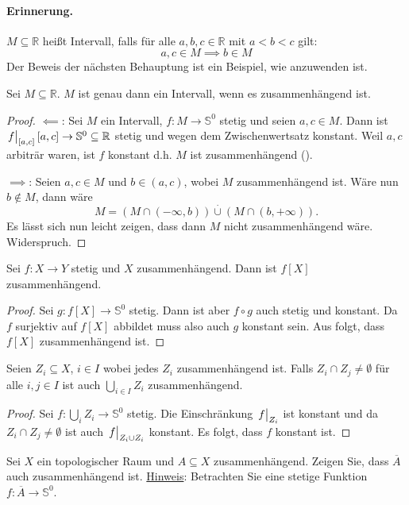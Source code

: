\documentclass[
12pt, 
openany, 
a4paper, 
final,
fleqn, 
]{myclass}
\numberwithin{equation}{chapter}
\numberwithin{section}{chapter}
\newcommand{\RR}{\mathbb R}
\newcommand{\Ss}{\mathbb S}
\newcommand{\union}{\bigcup}
\newcommand{\implication}[2]{\glqq {#1}$\implies${#2}\grqq}
\newcommand{\reverseimplication}[2]{\glqq {#1}$\impliedby${#2}\grqq}
\newcommand{\closure}[1]{\overline{#1}}
\newcommand{\eval}[1]{\left. \vphantom{\int}#1\right\lvert}
\newcommand{\hint}[1]{\newline\noindent\underline{Hinweis}: #1}
\begin{document}
\paragraph{Erinnerung.} $M\subseteq \RR$ heißt Intervall, falls für alle $a, b, c\in \RR$ mit $a<b<c$ gilt: 
\[
a, c \in M \implies b\in M
\]
Der Beweis der nächsten Behauptung ist ein Beispiel, wie  anzuwenden ist. 
\begin{prop}\label{3.4}
Sei $M\subseteq \RR$. $M$ ist genau dann ein Intervall, wenn es zusammenhängend ist. 
\end{prop}
\begin{proof}
\reverseimplication{}{}: Sei $M$ ein Intervall, $f:M \to \Ss^0$ stetig und seien $a, c\in M$. Dann ist $\eval{f}_{[a, c]} [a, c]\to \Ss^0\subseteq \RR$ stetig und wegen dem Zwischenwertsatz konstant. Weil $a, c$ arbiträr waren, ist $f$ konstant d.h. $M$ ist zusammenhängend ().

\implication{}{}: Seien $a, c \in M$ und $b\in (a,c)$, wobei $M$ zusammenhängend ist. Wäre nun $b\notin M$, dann wäre 
\[
M = (M\cap (-\infty, b)) \overset{\cdot}{\cup} (M\cap (b, +\infty)).
\]
Es lässt sich nun leicht zeigen, dass dann $M$ nicht zusammenhängend wäre. Widerspruch.
\end{proof}
\begin{cor}\label{3.5}
Sei $f: X\to Y$ stetig und $X$ zusammenhängend. Dann ist $f[X]$ zusammenhängend. 
\end{cor}
\begin{proof}
Sei $g: f[X] \to \Ss^0$ stetig. Dann ist aber $f\circ g$ auch stetig und konstant. Da $f$ surjektiv auf $f[X]$ abbildet muss also auch $g$ konstant sein. Aus  folgt, dass $f[X]$ zusammenhängend ist. 
\end{proof}

\begin{cor}\label{3.6}
Seien $Z_i\subseteq X$, $i\in I$ wobei jedes $Z_i$ zusammenhängend ist. Falls $Z_i\cap Z_j \neq \emptyset$ für alle $i,j\in I$ ist auch $\union_{i\in I} Z_i$ zusammenhängend. 
\end{cor}
\begin{proof}
Sei $f: \union_i Z_i \to \Ss^0$ stetig. Die Einschränkung $\eval{f}_{Z_i}$ ist konstant und da $Z_i\cap Z_j\neq \emptyset$ ist auch $\eval{f}_{Z_i\cup Z_i}$ konstant. Es folgt, dass $f$ konstant ist.
\end{proof}

\begin{ex}\label{ex1}
Sei $X$ ein topologischer Raum und $A\subseteq X$ zusammenhängend. Zeigen Sie, dass $\closure{A}$ auch zusammenhängend ist. \hint{Betrachten Sie eine stetige Funktion $f:\closure{A}\to \Ss^0$. }
\end{ex}
\end{document}
